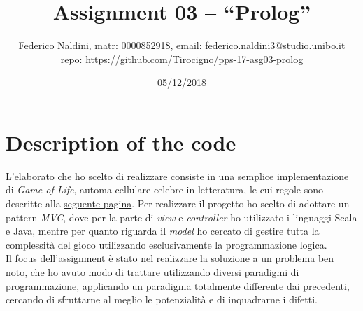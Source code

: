 \documentclass[10pt,italian]{article}
\title{\vspace{-70pt}Assignment 03 -- ``Prolog''}
\author{Federico Naldini, matr: 0000852918, email: {\url{federico.naldini3@studio.unibo.it}}\\ repo: {\url{https://github.com/Tirocigno/pps-17-asg03-prolog}}
\date{05/12/2018}}
\begin{document}
\maketitle
\vspace{-30pt}

\section{Description of the code}
L'elaborato che ho scelto di realizzare consiste in una semplice implementazione di \textit{Game of Life}, automa cellulare celebre in letteratura, le cui regole sono descritte alla \href{https://en.wikipedia.org/wiki/Conway\%27s_Game_of_Life#Rules}{seguente pagina}.
Per realizzare il progetto ho scelto di adottare un pattern \textit{MVC}, dove per la parte di \textit{view} e \textit{controller} ho utilizzato i linguaggi Scala e Java, mentre per quanto riguarda il \textit{model} ho cercato di gestire tutta la complessità del gioco utilizzando esclusivamente la programmazione logica.\\
Il focus dell'assignment è stato nel realizzare la soluzione a un problema ben noto, che ho avuto modo di trattare utilizzando diversi paradigmi di programmazione, applicando un paradigma totalmente differente dai precedenti, cercando di sfruttarne al meglio le potenzialità e di inquadrarne i difetti.
\end{document}
